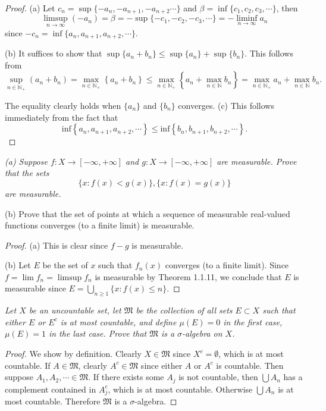 \begin{proof}
(a) Let $c_n=\sup\{-a_n,-a_{n+1},-a_{n+2}\cdots\}$ and $\beta=\inf\{c_1,c_2,c_3,\cdots\}$, then 
$$\limsup_{n\to\infty}(-a_n)=\beta=-\sup\{-c_1,-c_2,-c_3,\cdots\}=-\liminf_{n\to\infty}a_n$$
since $-c_n=\inf\{a_n,a_{n+1},a_{n+2},\cdots\}$.\par
(b) It suffices to show that $\sup\{a_n+b_n\}\le\sup\{a_n\}+\sup\{b_n\}$. This follows from 
$$
\mathop {\mathrm{sup}} \limits_{n\in \mathbb{N} _+}\left( a_n+b_n \right) =\max_{n\in \mathbb{N} _+} \left\{ a_n+b_n \right\} \le \max_{n\in \mathbb{N} _+} \left\{ a_n+\max_{n\in \mathbb{N}} b_n \right\} =\max_{n\in \mathbb{N} _+} a_n+\max_{n\in \mathbb{N}} b_n.
$$\par
The equality clearly holds when $\{a_n\}$ and $\{b_n\}$ converges.
(c) This follows immediately from the fact that 
$$
\mathrm{inf}\left\{ a_n,a_{n+1},a_{n+2},\cdots \right\} \le \mathrm{inf}\left\{ b_n,b_{n+1},b_{n+2},\cdots \right\} .
$$
\end{proof}
\begin{problem}\em
(a) Suppose $f:X\to[-\infty,+\infty]$ and $g:X\to[-\infty,+\infty]$ are measurable. Prove that the sets 
$$\{x:f(x)<g(x)\},\{x:f(x)=g(x)\}$$
are measurable.\par
(b) Prove that the set of points at which a sequence of measurable real-valued functions converges (to a finite limit) is measurable.
\end{problem}
\begin{proof}
(a) This is clear since $f-g$ is measurable.\par
(b) Let $E$ be the set of $x$ such that $f_n(x)$ converges (to a finite limit). Since $f=\lim f_n=\limsup f_n$ is measurable by Theorem 1.1.11, we conclude that $E$ is measurable since $E=\bigcup_{n\ge 1}\{x:f(x)\le n\}$.
\end{proof}
\begin{problem}\em
Let $X$ be an uncountable set, let $\mathfrak{M}$ be the collection of all sets $E\subset X$ such that either $E$ or $E^c$ is at most countable, and define $\mu(E)=0$ in the first case, $\mu(E)=1$ in the last case. Prove that $\mathfrak{M}$ is a $\sigma$-algebra on $X$.
\end{problem}
\begin{proof}
We show by definition. Clearly $X\in\mathfrak{M}$ since $X^c=\emptyset$, which is at most countable. If $A\in\mathfrak{M}$, clearly $A^c\in\mathfrak{M}$ since either $A$ or $A^c$ is countable. Then suppose $A_1,A_2,\cdots\in\mathfrak{M}$. If there exists some $A_j$ is not countable, then $\bigcup A_n$ has a complement contained in $A_j^c$, which is at most countable. Otherwise $\bigcup A_n$ is at most countable. Therefore $\mathfrak{M}$ is a $\sigma$-algebra.
\end{proof}
